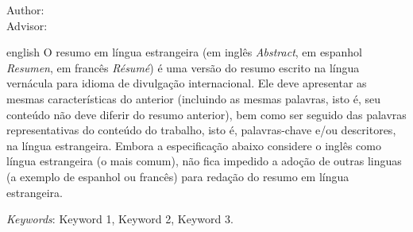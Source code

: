 \begin{center}
  {\Large{\textbf{\imprimirtituloestrangeiro}}}
\end{center}

\vspace{1cm}

\begin{flushright}
  Author: \imprimirautor\\
  Advisor: \imprimirorientador
\end{flushright}

\vspace{1cm}

\begin{resumo}[ABSTRACT]
  \begin{otherlanguage*}{english}
    O resumo em língua estrangeira (em inglês \textit{Abstract}, em espanhol \textit{Resumen}, em francês \textit{Résumé}) é uma versão do resumo escrito na língua vernácula para idioma de divulgação internacional. Ele deve apresentar as mesmas características do anterior (incluindo as mesmas palavras, isto é, seu conteúdo não deve diferir do resumo anterior), bem como ser seguido das palavras representativas do conteúdo do trabalho, isto é, palavras-chave e/ou descritores, na língua estrangeira. Embora a especificação abaixo considere o inglês como língua estrangeira (o mais comum), não fica impedido a adoção de outras linguas (a exemplo de espanhol ou francês) para redação do resumo em língua estrangeira.

    \vspace{\onelineskip}

    \noindent
    \textit{Keywords}: Keyword 1, Keyword 2, Keyword 3.
  \end{otherlanguage*}
\end{resumo}
